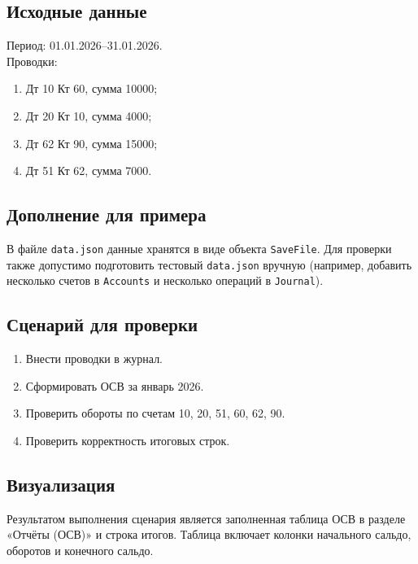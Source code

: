 \documentclass[14pt,a4paper]{extarticle}
\begin{document}
\subsection{Исходные данные}
Период: 01.01.2026--31.01.2026.\\
Проводки:
\begin{enumerate}
    \item Дт 10 Кт 60, сумма 10000;
    \item Дт 20 Кт 10, сумма 4000;
    \item Дт 62 Кт 90, сумма 15000;
    \item Дт 51 Кт 62, сумма 7000.
\end{enumerate}

\subsection{Дополнение для примера}
В файле \texttt{data.json} данные хранятся в виде объекта \texttt{SaveFile}. Для проверки также допустимо подготовить тестовый \texttt{data.json} вручную (например, добавить несколько счетов в \texttt{Accounts} и несколько операций в \texttt{Journal}).

\subsection{Сценарий для проверки}
\begin{enumerate}
    \item Внести проводки в журнал.
    \item Сформировать ОСВ за январь 2026.
    \item Проверить обороты по счетам 10, 20, 51, 60, 62, 90.
    \item Проверить корректность итоговых строк.
\end{enumerate}

\subsection{Визуализация}
Результатом выполнения сценария является заполненная таблица ОСВ в разделе «Отчёты (ОСВ)» и строка итогов. Таблица включает колонки начального сальдо, оборотов и конечного сальдо.
\end{document}
